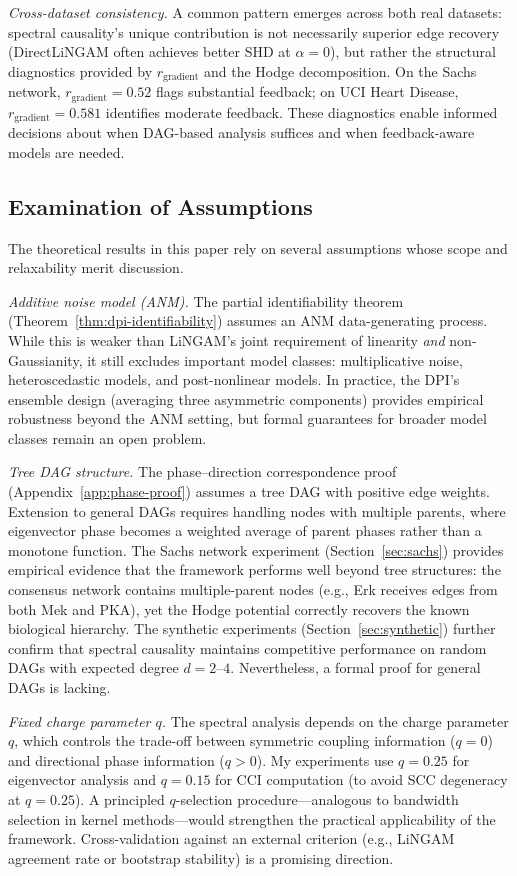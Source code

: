 \documentclass[twoside,11pt]{article}
\begin{document}
\emph{Cross-dataset consistency.}  A common pattern emerges across both
real datasets: spectral causality's unique contribution is not
necessarily superior edge recovery (DirectLiNGAM often achieves better
SHD at $\alpha=0$), but rather the structural diagnostics provided by
$r_{\mathrm{gradient}}$ and the Hodge decomposition.  On the Sachs
network, $r_{\mathrm{gradient}}=0.52$ flags substantial feedback; on
UCI Heart Disease, $r_{\mathrm{gradient}}=0.581$ identifies moderate
feedback.  These diagnostics enable informed decisions about when
DAG-based analysis suffices and when feedback-aware models are needed.

\subsection{Examination of Assumptions}

The theoretical results in this paper rely on several assumptions whose
scope and relaxability merit discussion.

\emph{Additive noise model (ANM).}  The partial identifiability theorem
(Theorem~\ref{thm:dpi-identifiability}) assumes an ANM data-generating
process.  While this is weaker than LiNGAM's joint requirement of
linearity \emph{and} non-Gaussianity, it still excludes important model
classes: multiplicative noise, heteroscedastic models, and
post-nonlinear models.  In practice, the DPI's ensemble design
(averaging three asymmetric components) provides empirical robustness
beyond the ANM setting, but formal guarantees for broader model classes
remain an open problem.

\emph{Tree DAG structure.}  The phase--direction correspondence proof
(Appendix~\ref{app:phase-proof}) assumes a tree DAG with positive edge
weights.  Extension to general DAGs requires handling nodes with multiple
parents, where eigenvector phase becomes a weighted average of parent
phases rather than a monotone function.  The Sachs network experiment
(Section~\ref{sec:sachs}) provides empirical evidence that the framework
performs well beyond tree structures: the consensus network contains
multiple-parent nodes (e.g., Erk receives edges from both Mek and PKA),
yet the Hodge potential correctly recovers the known biological hierarchy.
The synthetic experiments (Section~\ref{sec:synthetic}) further confirm
that spectral causality maintains competitive performance on random DAGs
with expected degree $d=2$--$4$.  Nevertheless, a formal proof for
general DAGs is lacking.

\emph{Fixed charge parameter $q$.}  The spectral analysis depends on the
charge parameter $q$, which controls the trade-off between symmetric
coupling information ($q=0$) and directional phase information ($q>0$).
My experiments use $q=0.25$ for eigenvector analysis and $q=0.15$ for
CCI computation (to avoid SCC degeneracy at $q=0.25$).  A principled
$q$-selection procedure---analogous to bandwidth selection in kernel
methods---would strengthen the practical applicability of the framework.
Cross-validation against an external criterion (e.g., LiNGAM agreement
rate or bootstrap stability) is a promising direction.
\end{document}
